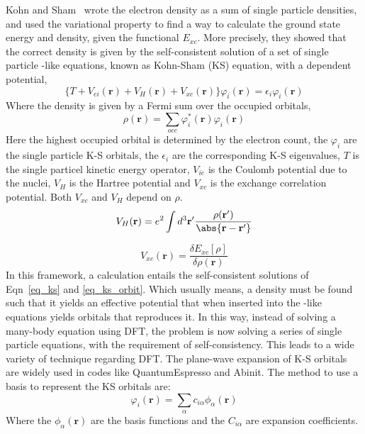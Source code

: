 Kohn and Sham~\cite{kohn1965self} wrote the electron density as a sum of single particle densities, and used the variational property to find a way to calculate the ground state energy and density, given the functional $E_{xc}$. More precisely, they showed that the correct density is given by the self-consistent solution of a set of single particle \schrod-like equations, known as Kohn-Sham (KS) equation, with a dependent potential,
\begin{equation}
\label{eq_ks}
\{T + V_{ei}(\mathbf{r}) + V_H (\mathbf{r}) + V_{xc}(\mathbf{r})\}\varphi_i(\mathbf{r}) = \epsilon_i \varphi_i(\mathbf{r})
\end{equation}
Where the density is given by a Fermi sum over the occupied orbitals,
\begin{equation}
\label{eq_ks_orbit}
\rho(\mathbf{r}) = \sum_{occ} \varphi^{\ast}_i (\mathbf{r})\varphi_i(\mathbf{r})
\end{equation}
Here the highest occupied orbital is determined by the electron count, the $\varphi_i$ are the single particle K-S orbitals, the $\epsilon_i$ are the corresponding K-S eigenvalues, $T$ is the single particel kinetic energy operator, $V_{ie}$ is the Coulomb potential due to the nuclei, $V_H$ is the Hartree potential and $V_{xc}$ is the exchange correlation potential. Both $V_{xc}$ and $V_H$ depend on $\rho$.
\begin{equation}
\label{eq_hartree_density}
V_H(\mathbf{r}) = e^2 \int d^3 \mathbf{r}' \frac{\rho(\mathbf{r'})}{\abs{\mathbf{r}-\mathbf{r'}}}
\end{equation}

\begin{equation}
\label{eq_xc_ks}
V_{xc}(\mathbf{r}) = \frac{\delta E_{xc}[\rho]}{\delta\rho(\mathbf{r})}
\end{equation}
In this framework, a calculation entails the self-consistent solutions of Eqn~\ref{eq_ks} and \ref{eq_ks_orbit}. Which usually means, a density must be found such that it yields an effective potential that when inserted into the \schrod-like equations yields orbitals that reproduces it. In this way, instead of solving a many-body \schrod equation using DFT,  the problem is now solving a series of single particle equations, with the requirement of self-consistency. This leads to a wide variety of technique regarding DFT. The plane-wave expansion of K-S orbitals are widely used in codes like QuantumEspresso and Abinit. The method to use a basis to represent the KS orbitals are:
\begin{equation}
\label{eq_basis}
\varphi_i (\mathbf{r}) = \sum_{\alpha} c_{i\alpha} \phi_{\alpha} (\mathbf{r})
\end{equation}
Where the $\phi_{\alpha}(\mathbf{r})$ are the basis functions and the $C_{i\alpha}$ are expansion coefficients.

